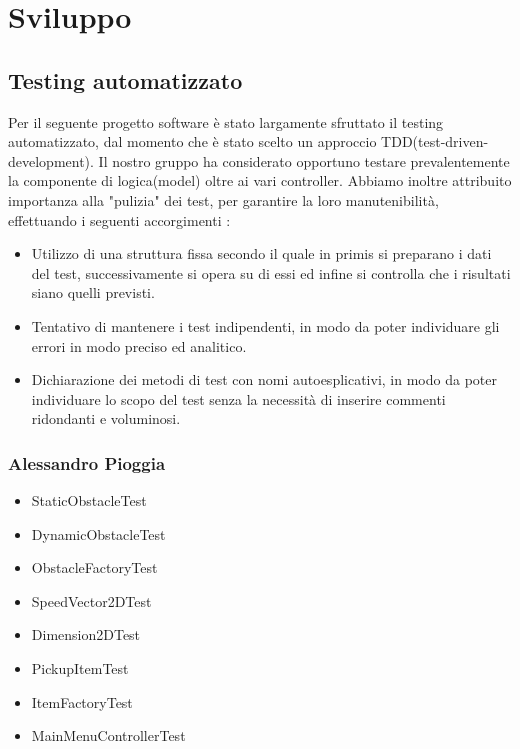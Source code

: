 
\chapter{Sviluppo}
\section{Testing automatizzato}

Per il seguente progetto software è stato largamente sfruttato il testing automatizzato, dal momento che è stato scelto un approccio TDD(test-driven-development). Il nostro gruppo ha considerato opportuno testare prevalentemente la componente di logica(model) oltre ai vari controller.
Abbiamo inoltre attribuito importanza alla "pulizia" dei test, per garantire la loro manutenibilità, effettuando i seguenti accorgimenti : 

\begin{itemize}
	\item Utilizzo di una struttura fissa secondo il quale in primis si preparano i dati del test, successivamente si opera su di essi ed infine si controlla che i risultati siano quelli previsti. 
	\item Tentativo di mantenere i test indipendenti, in modo da poter individuare gli errori in modo preciso ed analitico.
	\item Dichiarazione dei metodi di test con nomi autoesplicativi, in modo da poter individuare lo scopo del test senza la necessità di inserire commenti ridondanti e voluminosi.
\end{itemize}

\subsection*{Alessandro Pioggia}

\begin{itemize}
	\item StaticObstacleTest
	\item DynamicObstacleTest
	\item ObstacleFactoryTest
	\item SpeedVector2DTest
	\item Dimension2DTest
	\item PickupItemTest
	\item ItemFactoryTest
	\item MainMenuControllerTest
\end{itemize}


